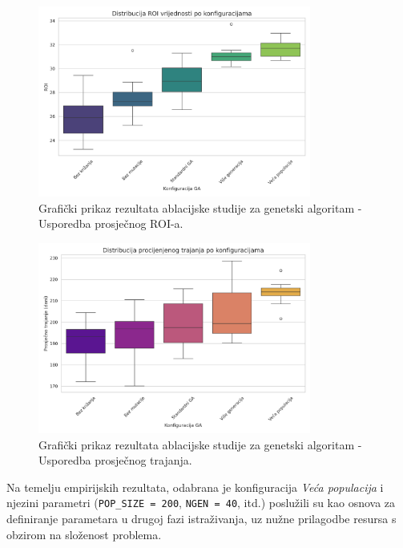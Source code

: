 \begin{figure}[H]
        \centering
        \includegraphics[width=0.8\textwidth]{slike/grafikoni_final/ga_boxplot_roi.png}
        \caption{Grafički prikaz rezultata ablacijske studije za genetski algoritam - Usporedba prosječnog ROI-a.}
        \label{fig:ga_roi}
\end{figure}
    \begin{figure}[H]
        \centering
        \includegraphics[width=0.8\textwidth]{slike/grafikoni_final/ga_boxplot_trajanje.png}
        \caption{Grafički prikaz rezultata ablacijske studije za genetski algoritam - Usporedba prosječnog trajanja.}
        \label{fig:ga_trajanje}
\end{figure}

Na temelju empirijskih rezultata, odabrana je konfiguracija \emph{Veća populacija} i njezini parametri (\texttt{POP\_SIZE = 200}, \texttt{NGEN = 40}, itd.) poslužili su kao osnova za definiranje parametara u drugoj fazi istraživanja, uz nužne prilagodbe resursa s obzirom na složenost problema.

